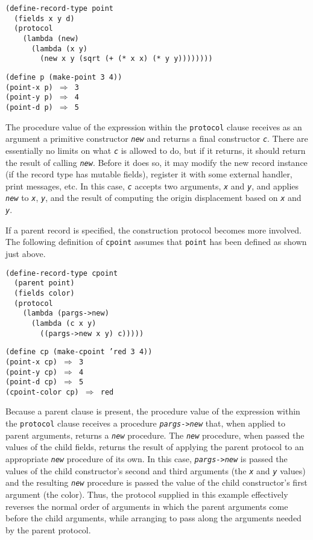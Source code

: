 \begin{alltt}
(define-record-type point
  (fields x y d)
  (protocol
    (lambda (new)
      (lambda (x y)
        (new x y (sqrt (+ (* x x) (* y y))))))))

(define p (make-point 3 4))
(point-x p) \(\Rightarrow\) 3
(point-y p) \(\Rightarrow\) 4
(point-d p) \(\Rightarrow\) 5
\end{alltt}


The procedure value of the expression within the \texttt{protocol} clause
receives as an argument a primitive
constructor \texttt{\textit{new}} and returns a final constructor \texttt{\textit{c}}.
There are essentially no limits on what \texttt{\textit{c}} is allowed to do, but if
it returns, it should return the result of calling \texttt{\textit{new}}.
Before it does so, it may modify the new record instance (if the record type
has mutable fields), register it with some external handler,
print messages, etc.
In this case, \texttt{\textit{c}} accepts two arguments, \texttt{\textit{x}} and \texttt{\textit{y}}, and
applies \texttt{\textit{new}} to \texttt{\textit{x}}, \texttt{\textit{y}}, and the result of computing the
origin displacement based on \texttt{\textit{x}} and \texttt{\textit{y}}.


If a parent record is specified, the construction protocol becomes
more involved.
The following definition of \texttt{cpoint} assumes that \texttt{point}
has been defined as shown just above.


\begin{alltt}
(define-record-type cpoint
  (parent point)
  (fields color)
  (protocol
    (lambda (pargs-\textgreater{}new)
      (lambda (c x y)
        ((pargs-\textgreater{}new x y) c)))))

(define cp (make-cpoint 'red 3 4))
(point-x cp) \(\Rightarrow\) 3
(point-y cp) \(\Rightarrow\) 4
(point-d cp) \(\Rightarrow\) 5
(cpoint-color cp) \(\Rightarrow\) red
\end{alltt}


Because a parent clause is present, the procedure value of the expression
within the \texttt{protocol} clause receives a procedure \texttt{\textit{pargs}-\textgreater{}\textit{new}}
that, when applied to parent arguments, returns a \texttt{\textit{new}} procedure.
The \texttt{\textit{new}} procedure, when passed the values of the child fields,
returns the result of applying the parent protocol to an appropriate
\texttt{\textit{new}} procedure of its own.
In this case, \texttt{\textit{pargs}-\textgreater{}\textit{new}} is passed the values of the child
constructor's second and third arguments (the \texttt{\textit{x}} and \texttt{\textit{y}} values)
and the resulting \texttt{\textit{new}} procedure is passed the value of the child
constructor's first argument (the color).
Thus, the protocol supplied in this example effectively reverses the
normal order of arguments in which the parent arguments come before the
child arguments, while arranging to pass along the arguments needed by the
parent protocol.


